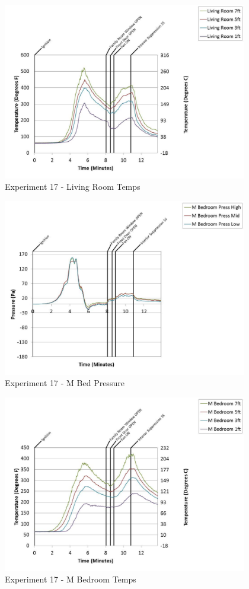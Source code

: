 \documentclass{article}
\begin{document}
\begin{appendices}
	\begin{figure}[h!]
		\centering
		\includegraphics[height=3.05in]{0_Images/Results_Charts/Exp_17_Charts/LivingRoomTemps.pdf}
		\caption{Experiment 17 - Living Room Temps}
	\end{figure}
 
	\clearpage

	\begin{figure}[h!]
		\centering
		\includegraphics[height=3.05in]{0_Images/Results_Charts/Exp_17_Charts/MBedPressure.pdf}
		\caption{Experiment 17 - M Bed Pressure}
	\end{figure}
 

	\begin{figure}[h!]
		\centering
		\includegraphics[height=3.05in]{0_Images/Results_Charts/Exp_17_Charts/MBedroomTemps.pdf}
		\caption{Experiment 17 - M Bedroom Temps}
	\end{figure}
 

\end{appendices}
\end{document}
